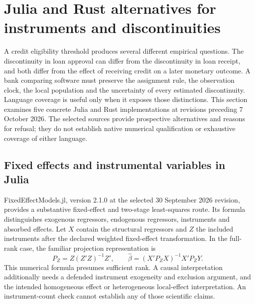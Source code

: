 \section{Julia and Rust alternatives for instruments and discontinuities}
\label{exec23:otheriv-scope}

A credit eligibility threshold produces several different empirical
questions. The discontinuity in loan approval can differ from the
discontinuity in loan receipt, and both differ from the effect of receiving
credit on a later monetary outcome. A bank comparing software must preserve
the assignment rule, the observation clock, the local population and the
uncertainty of every estimated discontinuity. Language coverage is useful
only when it exposes those distinctions. This section examines five concrete
Julia and Rust implementations at revisions preceding 7 October 2026. The
selected sources provide prospective alternatives and reasons for refusal;
they do not establish native numerical qualification or exhaustive coverage
of either language.
\citep{exec23_otheriv_source_0,exec23_otheriv_source_1,exec23_otheriv_source_2,exec23_otheriv_source_3,exec23_otheriv_source_4}

\subsection{Fixed effects and instrumental variables in Julia}
\label{exec23:otheriv-fe}
FixedEffectModels.jl, version 2.1.0 at the selected 30 September 2026
revision, provides a substantive fixed-effect and two-stage least-squares
route. Its formula distinguishes exogenous regressors, endogenous
regressors, instruments and absorbed effects. Let $X$ contain the structural
regressors and $Z$ the included instruments after the declared weighted
fixed-effect transformation. In the full-rank case, the familiar projection
representation is
\begin{equation}
 P_Z=Z(Z'Z)^{-1}Z',\qquad
 \widehat\beta=(X'P_ZX)^{-1}X'P_ZY.
 \label{exec23:otheriv-2sls}
\end{equation}
This numerical formula presumes sufficient rank. A causal interpretation
additionally needs a defended instrument exogeneity and exclusion argument,
and the intended homogeneous effect or heterogeneous local-effect
interpretation. An instrument-count check cannot establish any of those
scientific claims.
\citep{exec23_otheriv_source_0}

